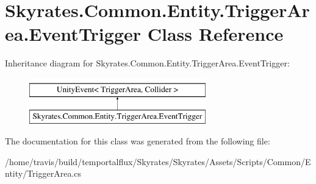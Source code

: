 \hypertarget{class_skyrates_1_1_common_1_1_entity_1_1_trigger_area_1_1_event_trigger}{\section{Skyrates.\-Common.\-Entity.\-Trigger\-Area.\-Event\-Trigger Class Reference}
\label{class_skyrates_1_1_common_1_1_entity_1_1_trigger_area_1_1_event_trigger}
}
Inheritance diagram for Skyrates.\-Common.\-Entity.\-Trigger\-Area.\-Event\-Trigger\-:\begin{figure}[H]
\begin{center}
\leavevmode
\includegraphics[height=2.000000cm]{class_skyrates_1_1_common_1_1_entity_1_1_trigger_area_1_1_event_trigger}
\end{center}
\end{figure}


The documentation for this class was generated from the following file\-:\begin{DoxyCompactItemize}
\item 
/home/travis/build/temportalflux/\-Skyrates/\-Skyrates/\-Assets/\-Scripts/\-Common/\-Entity/Trigger\-Area.\-cs\end{DoxyCompactItemize}
